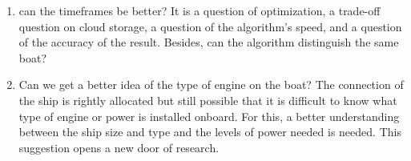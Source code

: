 \begin{enumerate}
    \item can the timeframes be better? It is a question of optimization, a trade-off question on cloud storage, a question of the algorithm's speed, and a question of the accuracy of the result. Besides, can the algorithm distinguish the same boat?
    
    \item Can we get a better idea of the type of engine on the boat? The connection of the ship is rightly allocated but still possible that it is difficult to know what type of engine or power is installed onboard. For this, a better understanding between the ship size and type and the levels of power needed is needed. This suggestion opens a new door of research.
\end{enumerate}
 
